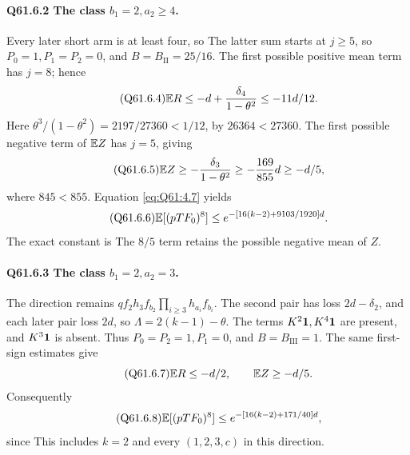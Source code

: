 \paragraph{Q61.6.2 The class \(b_1=\allowbreak 2,\allowbreak a_2\ge\allowbreak 4\).}
Every later short arm is at least four, so
The latter sum starts at \(j\ge\allowbreak 5\), so \(P_0=\allowbreak 1,\allowbreak P_1=\allowbreak P_2=\allowbreak 0\),
and \(B=\allowbreak B_{\mathrm {II}}=\allowbreak 25/16\).
The first possible positive mean term has \(j=\allowbreak 8\); hence
\begin{equation}\tag{Q61.6.4}\label{eq:Q61:6.4}
\mathbb E R\le-d+\frac{\delta_4}{1-\theta^2}\le-11d/12.
\end{equation}
Here \(\theta^3/(1-\theta^2)=\allowbreak 2197/27360<\allowbreak 1/12\), by
\(26364<\allowbreak 27360\). The first possible negative term of \(\mathbb E Z\)
has \(j=\allowbreak 5\), giving
\begin{equation}\tag{Q61.6.5}\label{eq:Q61:6.5}
\mathbb E Z\ge-\frac{\delta_3}{1-\theta^2}
\ge-\frac{169}{855}d\ge-d/5,
\end{equation}
where \(845<\allowbreak 855\). Equation \eqref{eq:Q61:4.7} yields
\begin{equation}\tag{Q61.6.6}\label{eq:Q61:6.6}
\mathbb E[(pTF_0)^8]\le e^{-[16(k-2)+9103/1920]d}.
\end{equation}
The exact constant is
The \(8/5\) term retains the possible negative mean of \(Z\).

\paragraph{Q61.6.3 The class \(b_1=\allowbreak 2,\allowbreak a_2=\allowbreak 3\).}
The direction remains
\(qf_2h_3f_{b_2}\prod_{i\ge\allowbreak 3}h_{a_i}f_{b_i}\).
The second pair has loss \(2d-\delta_2\), and each later pair loss
\(2d\), so \(\Lambda=\allowbreak 2(k-1)-\theta\).
The terms \(K^2\mathbf1,\allowbreak K^4\mathbf1\) are present, and \(K^3\mathbf1\) is absent.
Thus \(P_0=\allowbreak P_2=\allowbreak 1,\allowbreak P_1=\allowbreak 0\), and \(B=\allowbreak B_{\mathrm {III}}=\allowbreak 1\).
The same first-sign estimates give
\begin{equation}\tag{Q61.6.7}\label{eq:Q61:6.7}
\mathbb E R\le-d/2,\qquad\mathbb E Z\ge-d/5.
\end{equation}
Consequently
\begin{equation}\tag{Q61.6.8}\label{eq:Q61:6.8}
\mathbb E[(pTF_0)^8]\le e^{-[16(k-2)+171/40]d},
\end{equation}
since
This includes \(k=\allowbreak 2\) and every \((1,\allowbreak 2,\allowbreak 3,\allowbreak c)\) in this direction.

